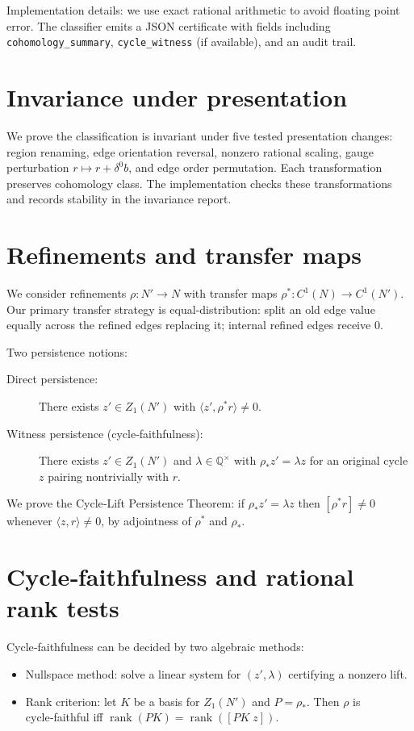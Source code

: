 \documentclass[11pt]{article}
\begin{document}
Implementation details: we use exact rational arithmetic \cite{sympy} to avoid
floating point error. The classifier emits a JSON certificate with fields
including \texttt{cohomology\_summary}, \texttt{cycle\_witness} (if available), and an audit trail.

\section{Invariance under presentation}
We prove the classification is invariant under five tested presentation changes:
region renaming, edge orientation reversal, nonzero rational scaling, gauge
perturbation $r\mapsto r+\delta^0 b$, and edge order permutation. Each
transformation preserves cohomology class. The implementation checks these
transformations and records stability in the invariance report.

\section{Refinements and transfer maps}
We consider refinements $\rho: N'\to N$ with transfer maps $\rho^*:C^1(N)\to C^1(N')$.
Our primary transfer strategy is equal‑distribution: split an old edge value
equally across the refined edges replacing it; internal refined edges receive 0.

Two persistence notions:
\begin{description}
\item[Direct persistence:] There exists $z'\in Z_1(N')$ with $\langle z',\rho^* r\rangle\ne0$.
\item[Witness persistence (cycle‑faithfulness):] There exists $z'\in Z_1(N')$ and
  $\lambda\in\mathbb{Q}^\times$ with $\rho_* z' = \lambda z$ for an original
  cycle $z$ pairing nontrivially with $r$.
\end{description}

We prove the Cycle‑Lift Persistence Theorem: if $\rho_* z' = \lambda z$ then
$[\rho^* r]\ne0$ whenever $\langle z,r\rangle\ne0$, by adjointness of $\rho^*$ and $\rho_*$.

\section{Cycle‑faithfulness and rational rank tests}
Cycle‑faithfulness can be decided by two algebraic methods:
\begin{itemize}
\item Nullspace method: solve a linear system for $(z',\lambda)$ certifying a nonzero lift.
\item Rank criterion: let $K$ be a basis for $Z_1(N')$ and $P=\rho_*$. Then $\rho$ is
  cycle‑faithful iff $\operatorname{rank}(PK)=\operatorname{rank}([PK\; z])$.
\end{itemize}
\end{document}
